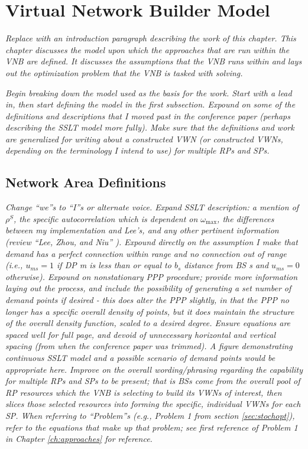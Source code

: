 \documentclass[12pt,dvips]{report}
\begin{document}
\pagebreak
\chapter{Virtual Network Builder Model} \label{ch:vnbmodel}

\textit{Replace with an introduction paragraph describing the work of this chapter.  This chapter discusses the model upon which the approaches that are run within the VNB are defined.  It discusses the assumptions that the VNB runs within and lays out the optimization problem that the VNB is tasked with solving.}

\textit{Begin breaking down the model used as the basis for the work.  Start with a lead in, then start defining the model in the first subsection.  Expound on some of the definitions and descriptions that I moved past in the conference paper (perhaps describing the SSLT model more fully).  Make sure that the definitions and work are generalized for writing about a constructed VWN (or constructed VWNs, depending on the terminology I intend to use) for multiple RPs and SPs.}

\section{Network Area Definitions} \label{sec:networkdefs}

\textit{Change ``we''s to ``I''s or alternate voice.  Expand SSLT description: a mention of $\rho^S$, the specific autocorrelation which is dependent on $\omega_{\max}$, the differences between my implementation and Lee's, and any other pertinent information (review ``Lee, Zhou, and Niu'' \cite{6554749}).  Expound directly on the assumption I make that demand has a perfect connection within range and no connection out of range (i.e., $u_{ms} = 1$ if DP m is less than or equal to $b_s$ distance from BS s and $u_{ms} = 0$ otherwise).  Expound on nonstationary PPP procedure; provide more information laying out the process, and include the possibility of generating a set number of demand points if desired - this does alter the PPP slightly, in that the PPP no longer has a specific overall density of points, but it does maintain the structure of the overall density function, scaled to a desired degree.  Ensure equations are spaced well for full page, and devoid of unnecessary horizontal and vertical spacing (from when the conference paper was trimmed).  A figure demonstrating continuous SSLT model and a possible scenario of demand points would be appropriate here.  Improve on the overall wording/phrasing regarding the capability for multiple RPs and SPs to be present; that is BSs come from the overall pool of RP resources which the VNB is selecting to build its VWNs of interest, then slices those selected resources into forming the specific, individual VWNs for each SP.  When referring to ``Problem''s (e.g., Problem 1 from section \ref{sec:stochopt}), refer to the equations that make up that problem; see first reference of Problem 1 in Chapter \ref{ch:approaches} for reference.}
\end{document}
